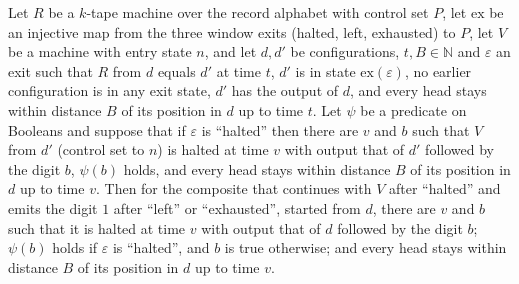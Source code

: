 \begin{lemma}
\label{Complexity.sph_runner_tail_run}
\leanok
{}
Let $R$ be a $k$-tape machine over the record alphabet with control set $P$, let $\mathrm{ex}$ be an
injective map from the three window exits (halted, left, exhausted) to $P$, let $V$ be a machine
with entry state $n$, and let $d,d'$ be configurations, $t,B\in\mathbb{N}$ and $\varepsilon$ an
exit such that $R$ from $d$ equals $d'$ at time $t$, $d'$ is in state $\mathrm{ex}(\varepsilon)$, no
earlier configuration is in any exit state, $d'$ has the output of $d$, and every head stays
within distance $B$ of its position in $d$ up to time $t$. Let $\psi$ be a predicate on Booleans
and suppose that if $\varepsilon$ is ``halted'' then there are $v$ and $b$ such that $V$ from $d'$
(control set to $n$) is halted at time $v$ with output that of $d'$ followed by the digit $b$,
$\psi(b)$ holds, and every head stays within distance $B$ of its position in $d$ up to time $v$.
Then for the composite that continues with $V$ after ``halted'' and emits the digit $1$ after
``left'' or ``exhausted'', started from $d$, there are $v$ and $b$ such that it is halted at time
$v$ with output that of $d$ followed by the digit $b$; $\psi(b)$ holds if $\varepsilon$ is
``halted'', and $b$ is true otherwise; and every head stays within distance $B$ of its position in
$d$ up to time $v$.
\end{lemma}

